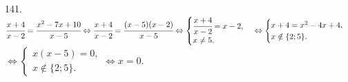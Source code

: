 141. $\cfrac{x+4}{x-2}=\cfrac{x^2-7x+10}{x-5}\Leftrightarrow
\cfrac{x+4}{x-2}=\cfrac{(x-5)(x-2)}{x-5}\Leftrightarrow
\begin{cases} \cfrac{x+4}{x-2}=x-2,\\ x\neq5.\end{cases}\Leftrightarrow
\begin{cases} x+4=x^2-4x+4,\\ x\notin\{2;5\}.\end{cases}$\\$\Leftrightarrow
\begin{cases} x(x-5)=0,\\ x\notin\{2;5\}.\end{cases}\Leftrightarrow x=0.$\\
